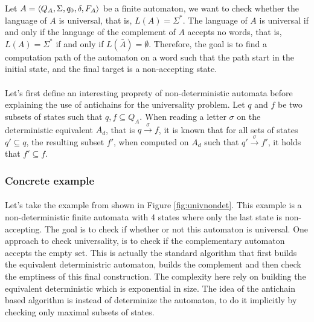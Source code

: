 \documentclass[11pt,a4paper]{article}
\DeclarePairedDelimiter{\tuple}{\langle}{\rangle}
\theoremstyle{definition}
\begin{document}
Let $A = \tuple{Q_A, \Sigma, q_0, \delta, F_A}$ be a finite automaton,
we want to check whether
the language of $A$ is universal, that is, $L(A) = \Sigma^*$.
The language of $A$ is universal if and only if the language
of the complement of $A$ accepts no words, that is,
$L(A) = \Sigma^*$ if and only if $L(\bar{A}) = \emptyset$.
Therefore, the goal is to find a computation path of the
automaton on a word such that the path start in the initial state,
and the final target is a non-accepting state.

\paragraph{}

Let's first define an interesting proprety of non-deterministic automata
before explaining the use of antichains for the universality problem.
Let $q$ and $f$ be two subsets of states such that $q, f \subseteq Q_A$.
When reading a letter $\sigma$ on the deterministic equivalent
$A_d$, that is $q \xrightarrow{\sigma} f$, it is known that
for all sets of states $q' \subseteq q$, the resulting subset
$f'$, when computed on $A_d$ such that $q' \xrightarrow{\sigma} f'$,
it holds that $f' \subseteq f$.

\subsubsection{Concrete example}

\paragraph{}

Let's take the example from \cite{AC_universality}
shown in Figure \ref{fig:univnondet}. This example is a
non-deterministic finite automata with 4 states where
only the last state is non-accepting.
The goal is to check
if whether or not this automaton is universal.
One approach to check universality, is to check if the
complementary automaton accepts the empty set.
This is actually the standard algorithm that first builds
the equivalent deterministric automaton, builds the complement
and then check the emptiness of this final construction.
The complexity here rely on building the equivalent deterministic
which is exponential in size. The idea of the antichain based
algorithm is instead of determinize the automaton, to
do it implicitly by checking only maximal subsets of states.
\end{document}
